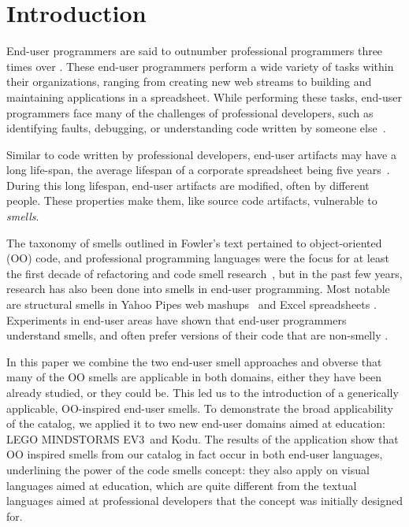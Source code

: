 \documentclass{sig-alternate}
\newcommand{\ms}{LEGO MINDSTORMS EV3}
\begin{document}
\section{Introduction}
End-user programmers are said to outnumber  professional programmers three times over \cite{Scaf2005}.
These end-user programmers perform a wide variety of tasks within their organizations, ranging from creating new web streams to building and maintaining applications in a spreadsheet. While performing these tasks, end-user programmers face many of the challenges of professional developers, such as identifying faults, debugging, or understanding code written by someone else~\cite{Ko2011}.

Similar to code written by professional developers, end-user artifacts may have a long life-span, the average lifespan of a corporate spreadsheet being five years~\cite{Hermans2011}. During this long lifespan, end-user artifacts are modified, often by different people.
These properties make them, like source code artifacts, vulnerable to \emph{smells}. 

The taxonomy of smells outlined in Fowler's text pertained to object-oriented (OO) code, and professional programming languages were the focus for at least the first decade of refactoring and code smell research~\cite{Mens:2004:SSR:972215.972286}, but in the past few years, research has also been done into smells in end-user programming. Most notable are structural smells in Yahoo Pipes web mashups~\cite{Stolee2011} and Excel spreadsheets \cite{Hermans2012inter}. Experiments in end-user areas have shown that end-user programmers understand smells, and often prefer versions of their code that are non-smelly \cite{Hermans2012intra, StoleeTSE2013, chambers2013smell}. 


In this paper we combine the two end-user smell approaches and obverse that many of the OO smells are applicable in both domains, either they have been already studied, or they could be. This led us to the introduction of a generically applicable, OO-inspired end-user smells. To demonstrate the broad applicability of the catalog, we applied it to two new end-user domains aimed at education: \ms~and Kodu. The results of the application show that OO inspired smells from our catalog in fact occur in both end-user languages, underlining the power of the code smells concept: they also apply on visual languages aimed at education, which are quite different from the textual languages aimed at professional developers that the concept was initially designed for. 
\end{document}
